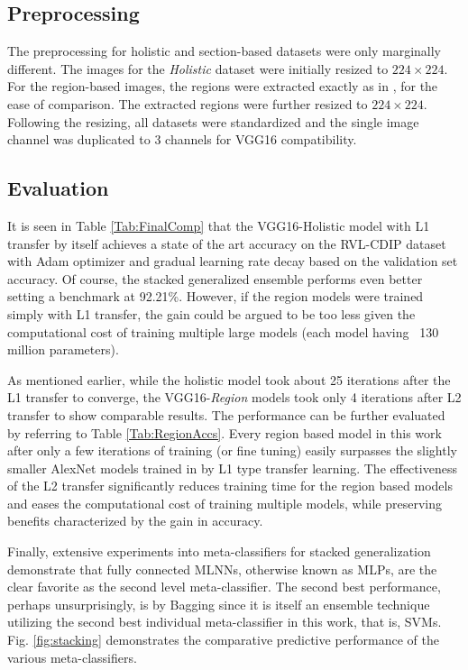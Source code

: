 \documentclass[10pt,conference,a4paper]{IEEEtran}
\begin{document}
\subsection{Preprocessing}
The preprocessing for holistic and section-based datasets were only marginally different. The images for the \textit{Holistic} dataset were initially resized to $224 \times 224$. For the region-based images, the regions were extracted exactly as in \cite{harley2015evaluation}, for the ease of comparison. The extracted regions were further resized to $224 \times 224$. Following the resizing, all datasets were standardized and the single image channel was duplicated to 3 channels for VGG16 compatibility.

\subsection{Evaluation}
It is seen in Table \ref{Tab:FinalComp} that the VGG16-Holistic model with L1 transfer by itself achieves a state of the art accuracy on the RVL-CDIP dataset with Adam optimizer and gradual learning rate decay based on the validation set accuracy. Of course, the stacked generalized ensemble performs even better setting a benchmark at 92.21\%. However, if the region models were trained simply with L1 transfer, the gain could be argued to be too less given the computational cost of training multiple large models (each model having ~130 million parameters).

As mentioned earlier, while the holistic model took about 25 iterations after the L1 transfer to converge, the VGG16-\textit{Region} models took only 4 iterations after L2 transfer to show comparable results. The performance can be further evaluated by referring to Table \ref{Tab:RegionAccs}. Every region based model in this work after only a few iterations of training (or fine tuning) easily surpasses the slightly smaller AlexNet models trained in \cite{harley2015evaluation} by L1 type transfer learning. The effectiveness of the L2 transfer significantly reduces training time for the region based models and eases the computational cost of training multiple models, while preserving benefits characterized by the gain in accuracy.

Finally, extensive experiments into meta-classifiers for stacked generalization demonstrate that fully connected MLNNs, otherwise known as MLPs, are the clear favorite as the second level meta-classifier. The second best performance, perhaps unsurprisingly, is by Bagging since it is itself an ensemble technique utilizing the second best individual meta-classifier in this work, that is, SVMs. Fig. \ref{fig:stacking} demonstrates the comparative predictive performance of the various meta-classifiers.
\end{document}
